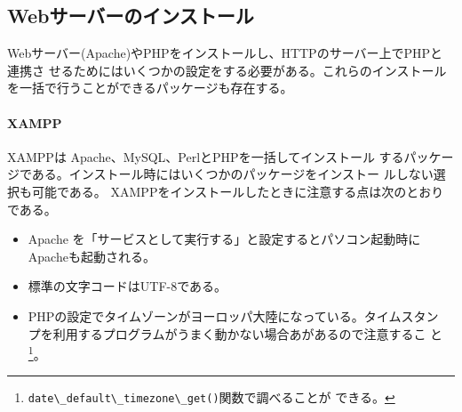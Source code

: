 \subsection{Webサーバーのインストール}
Webサーバー(Apache)やPHPをインストールし、HTTPのサーバー上でPHPと連携さ
せるためにはいくつかの設定をする必要がある。これらのインストール
を一括で行うことができるパッケージも存在する。
\paragraph{XAMPP}XAMPPは Apache、MySQL、PerlとPHPを一括してインストール
するパッケージである。インストール時にはいくつかのパッケージをインストー
ルしない選択も可能である。%
XAMPPをインストールしたときに注意する点は次のとおりである。
\begin{itemize}
 \item Apache を「サービスとして実行する」と設定するとパソコン起動時に
			 Apacheも起動される。
 \item 標準の文字コードは{UTF-8}である。
 \item PHPの設定でタイムゾーンがヨーロッパ大陸になっている。タイムスタン
       プを利用するプログラムがうまく動かない場合あがあるので注意するこ
       と\footnote{\Verb+date\_default\_timezone\_get()+関数で調べることが
       できる。}。
\end{itemize}



